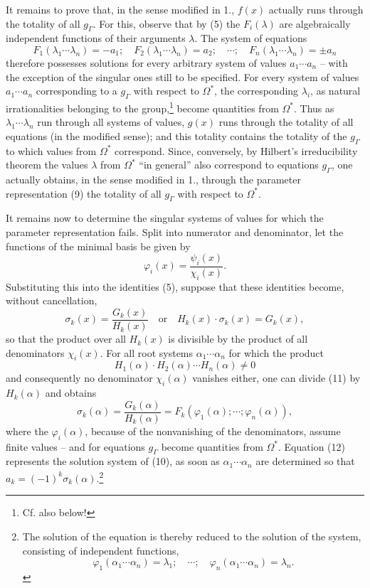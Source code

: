 \documentclass[11pt]{article}
\begin{document}
It remains to prove that, in the sense modified in 1., $f(x)$ actually runs through the totality of all $g_\Gamma$. For this, observe that by (5) the $F_i(\lambda)$ are algebraically independent functions of their arguments $\lambda$. The system of equations
\begin{equation}
F_1(\lambda_1\cdots\lambda_n)=-a_1;\quad F_2(\lambda_1\cdots\lambda_n)=a_2;\quad \cdots;\quad F_n(\lambda_1\cdots\lambda_n)=\pm a_n
\tag{10}
\end{equation}
therefore possesses solutions for every arbitrary system of values $a_1\cdots a_n$ -- with the exception of the singular ones still to be specified. For every system of values $a_1\cdots a_n$ corresponding to a $g_\Gamma$ with respect to $\Omega^*$, the corresponding $\lambda_i$, as natural irrationalities belonging to the group,\footnote{Cf. also below!} become quantities from $\Omega^*$. Thus as $\lambda_1\cdots\lambda_n$ run through all systems of values, $g(x)$ runs through the totality of all equations (in the modified sense); and this totality contains the totality of the $g_\Gamma$ to which values from $\Omega^*$ correspond. Since, conversely, by Hilbert's irreducibility theorem the values $\lambda$ from $\Omega^*$ ``in general'' also correspond to equations $g_\Gamma$, one actually obtains, in the sense modified in 1., through the parameter representation (9) the totality of all $g_\Gamma$ with respect to $\Omega^*$.

It remains now to determine the singular systems of values for which the parameter representation fails. Split into numerator and denominator, let the functions of the minimal basis be given by
\[
\varphi_i(x)=\frac{\psi_i(x)}{\chi_i(x)}.
\]
Substituting this into the identities (5), suppose that these identities become, without cancellation,
\begin{equation}
\sigma_k(x)=\frac{G_k(x)}{H_k(x)}\quad\text{or}\quad H_k(x)\cdot\sigma_k(x)=G_k(x),
\tag{11}
\end{equation}
so that the product over all $H_k(x)$ is divisible by the product of all denominators $\chi_i(x)$. For all root systems $\alpha_1\cdots\alpha_n$ for which the product
\[
H_1(\alpha)\cdot H_2(\alpha)\cdots H_n(\alpha)\neq0
\]
and consequently no denominator $\chi_i(\alpha)$ vanishes either, one can divide (11) by $H_k(\alpha)$ and obtains
\begin{equation}
\sigma_k(\alpha)=\frac{G_k(\alpha)}{H_k(\alpha)}=F_k(\varphi_1(\alpha);\cdots;\varphi_n(\alpha)),
\tag{12}
\end{equation}
where the $\varphi_i(\alpha)$, because of the nonvanishing of the denominators, assume finite values -- and for equations $g_\Gamma$ become quantities from $\Omega^*$. Equation (12) represents the solution system of (10), as soon as $\alpha_1\cdots\alpha_n$ are determined so that $a_k=(-1)^k\sigma_k(\alpha)$.\footnote{The solution of the equation is thereby reduced to the solution of the system, consisting of independent functions,
\[
\varphi_1(\alpha_1\cdots\alpha_n)=\lambda_1;\quad \cdots;\quad \varphi_n(\alpha_1\cdots\alpha_n)=\lambda_n.
\]}
\end{document}
